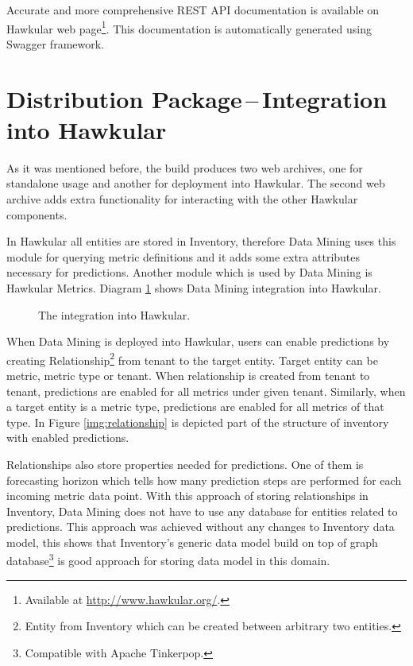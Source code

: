     Accurate and more comprehensive REST API documentation is available on Hawkular web page\footnote{Available at
    \url{http://www.hawkular.org/}.}. This documentation is automatically generated using Swagger framework.

    \section{Distribution Package\,--\,Integration into Hawkular} \label{sec:dist}
    As it was mentioned before, the build produces two web archives, one for standalone usage and another for
    deployment into Hawkular. The second web archive adds extra functionality for interacting with the other Hawkular
    components.

    In Hawkular all entities are stored in Inventory, therefore Data Mining uses this module
    for querying metric definitions and it adds some extra attributes necessary for predictions. Another module
    which is used by Data Mining is Hawkular Metrics. Diagram \ref{img:hawkular-interaction} shows Data Mining
    integration into Hawkular.

    \begin{figure}[H]
        \begin{center}
            \caption{The integration into Hawkular.}
            \label{img:hawkular-interaction}
        \end{center}
    \end{figure}

    When Data Mining is deployed into Hawkular, users can enable predictions by creating Relationship\footnote{Entity
    from Inventory which can be created between arbitrary two entities.} from tenant to the target entity. Target
    entity can be metric, metric type or tenant. When relationship is created from tenant to tenant, predictions are
    enabled for all metrics under given tenant. Similarly, when a target entity is a metric type, predictions are
    enabled for all metrics of that type. In Figure \ref{img:relationship} is depicted part of the structure of
    inventory with enabled predictions.

    Relationships also store properties needed for predictions. One of them is forecasting horizon which tells how
    many prediction steps are performed for each incoming metric data point. With this approach of storing
    relationships in Inventory, Data Mining does not have to use any database for entities related to predictions.
    This approach was achieved without any changes to Inventory data model, this shows that Inventory's generic data
    model build on top of graph database\footnote{Compatible with Apache Tinkerpop.} is good approach for storing data
    model in this domain.

